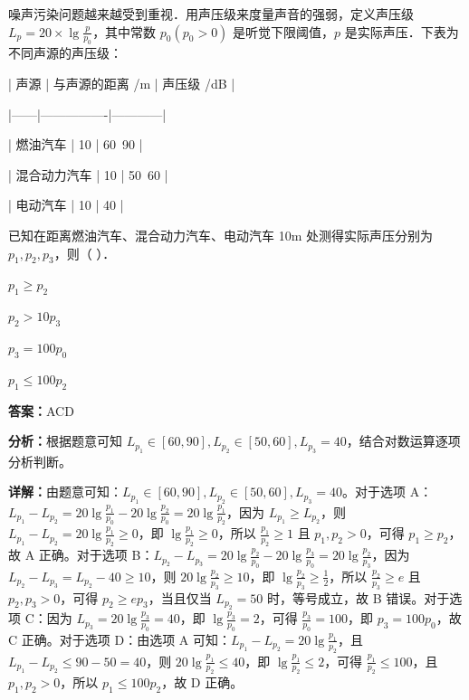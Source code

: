 \begin{question}[points=5]
噪声污染问题越来越受到重视．用声压级来度量声音的强弱，定义声压级 $L_p=20\times\lg\frac{p}{p_0}$，其中常数 $p_0(p_0>0)$ 是听觉下限阈值，$p$ 是实际声压．下表为不同声源的声压级：



| 声源 | 与声源的距离 /m | 声压级 /dB |

|------|----------------|------------|

| 燃油汽车 | 10 | 60~90 |

| 混合动力汽车 | 10 | 50~60 |

| 电动汽车 | 10 | 40 |



已知在距离燃油汽车、混合动力汽车、电动汽车 10m 处测得实际声压分别为 $p_1, p_2, p_3$，则（ ）．
\begin{choices}
  \item $p_1\geq p_2$
  \item $p_2>10p_3$
  \item $p_3=100p_0$
  \item $p_1\leq 100p_2$
\end{choices}
\begin{solution}
\textbf{答案：}ACD

\textbf{分析：}根据题意可知 $L_{p_1}\in[60,90], L_{p_2}\in[50,60], L_{p_3}=40$，结合对数运算逐项分析判断。

\textbf{详解：}由题意可知：$L_{p_1}\in[60,90], L_{p_2}\in[50,60], L_{p_3}=40$。对于选项 A：$L_{p_1}-L_{p_2}=20\lg\frac{p_1}{p_0}-20\lg\frac{p_2}{p_0}=20\lg\frac{p_1}{p_2}$，因为 $L_{p_1}\geq L_{p_2}$，则 $L_{p_1}-L_{p_2}=20\lg\frac{p_1}{p_2}\geq 0$，即 $\lg\frac{p_1}{p_2}\geq 0$，所以 $\frac{p_1}{p_2}\geq 1$ 且 $p_1,p_2>0$，可得 $p_1\geq p_2$，故 A 正确。对于选项 B：$L_{p_2}-L_{p_3}=20\lg\frac{p_2}{p_0}-20\lg\frac{p_3}{p_0}=20\lg\frac{p_2}{p_3}$，因为 $L_{p_2}-L_{p_3}=L_{p_2}-40\geq 10$，则 $20\lg\frac{p_2}{p_3}\geq 10$，即 $\lg\frac{p_2}{p_3}\geq \frac{1}{2}$，所以 $\frac{p_2}{p_3}\geq e$ 且 $p_2,p_3>0$，可得 $p_2\geq e p_3$，当且仅当 $L_{p_2}=50$ 时，等号成立，故 B 错误。对于选项 C：因为 $L_{p_3}=20\lg\frac{p_3}{p_0}=40$，即 $\lg\frac{p_3}{p_0}=2$，可得 $\frac{p_3}{p_0}=100$，即 $p_3=100p_0$，故 C 正确。对于选项 D：由选项 A 可知：$L_{p_1}-L_{p_2}=20\lg\frac{p_1}{p_2}$，且 $L_{p_1}-L_{p_2}\leq 90-50=40$，则 $20\lg\frac{p_1}{p_2}\leq 40$，即 $\lg\frac{p_1}{p_2}\leq 2$，可得 $\frac{p_1}{p_2}\leq 100$，且 $p_1,p_2>0$，所以 $p_1\leq 100p_2$，故 D 正确。
\end{solution}
\end{question}

